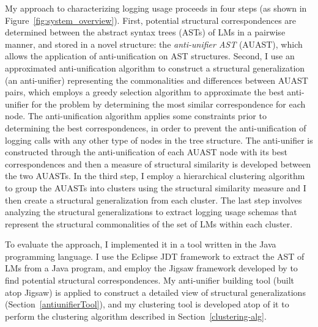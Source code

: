 My approach to characterizing logging usage proceeds in four steps (as shown in Figure~\ref{fig:system_overview}). First, potential structural correspondences are determined between the abstract syntax trees (ASTs) of LMs in a pairwise manner, and stored in a novel structure: the \emph{anti-unifier AST} (AUAST), which allows the application of anti-unification on AST structures. Second, I use an approximated anti-unification algorithm to construct a structural generalization (an anti-unifier) representing the commonalities and differences between AUAST pairs, which employs a greedy selection algorithm to approximate the best anti-unifier for the problem by determining the most similar correspondence for each node. The anti-unification algorithm applies some constraints prior to determining the best correspondences, in order to prevent the anti-unification of logging calls with any other type of nodes in the tree structure. The anti-unifier is constructed through the anti-unification of each AUAST node with its best correspondences and then a measure of structural similarity is developed between the two AUASTs.
In the third step, I employ a hierarchical clustering algorithm to group the AUASTs into clusters using the structural similarity measure and I then create a structural generalization from each cluster. %
The last step involves analyzing the structural generalizations to extract logging usage schemas that represent the structural commonalities of the set of LMs within each cluster.

To evaluate the approach, I implemented it in a tool written in the Java programming language. I use the Eclipse JDT framework to extract the AST of LMs from a Java program, and employ the Jigsaw framework developed by \citet{2008:fse:cottrell} to find potential structural correspondences. My anti-unifier building tool (built atop Jigsaw) is applied to construct a detailed view of structural generalizations (Section~\ref{antiunifierTool}), and my clustering tool is developed atop of it to perform the clustering algorithm described in Section~\ref{clustering-alg}.

